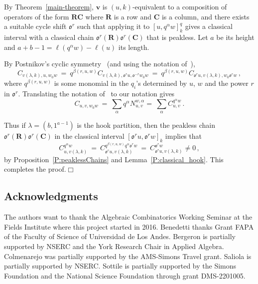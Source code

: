 \documentclass[12pt,oneside,reqno]{amsart}
\theoremstyle{definition}
\numberwithin{equation}{section}
\newcommand{\qv}{{\mathbf v}}
\newcommand{\ncycle}{\mathfrak o}
\def\R{\mathbf{R}}
\def\C{\mathbf{C}}
\begin{document}
By Theorem~\ref{main-theorem}, $\qv$ is $(u,k)$-equivalent to a composition of operators of the form
$\R\C$ where $\R$ is a row and $\C$ is a column, and there exists a
suitable cycle shift $\ncycle^r$ such that applying it to  $[u,q^\alpha w]^q_k$ gives a classical interval with
a classical chain $\ncycle^r(\R)\ncycle^r(\C)$ that is peakless.
Let $a$ be its height and $a+b-1=\ell(q^\alpha w)-\ell(u)$ its length.
 
By Postnikov's cyclic symmetry~\cite[Thm.~4]{Postnikov_symmetry} (and using the notation of~\cite{Postnikov_symmetry}),
\[
   C_{v(\lambda,k),u,w_0w}\ =\ q^{\beta(r,u,w)}C_{v(\lambda,k),\ncycle^{r} u,\ncycle^{-r}w_0w}\ =\ 
   q^{\beta(r,u,w)}C_{\ncycle^{r} u,v(\lambda,k),w_0\ncycle^{r}w}\,,
\]
where $q^{\beta(r,u,w)}$ is some monomial in the $q_i$'s determined by $u$, $w$ and the power $r$ in $\ncycle^r$.
Translating the notation of~\cite{Postnikov_symmetry} to our notation gives
\[
C_{u,v,w_0w}\ =\ \sum_\alpha q^\alpha N_{u,v}^{w,\alpha}=\ \sum_\alpha C_{u,v}^{q^\alpha w} \,.
\]

Thus if $\lambda=(b,1^{a-1})$ is the hook partition, then the peakless chain $\ncycle^r(\R)\ncycle^r(\C)$ in the classical interval 
$[\ncycle^{r} u,\ncycle^{r}w]_k$ implies that
\[
   C_{u,v(\lambda,k)}^{q^\alpha w}\ =\ C_{\ncycle^{r} u,v(\lambda,k)}^{ q^{\beta(r,u,w)}q^\alpha \ncycle^{r}w}\ =\
   C_{\ncycle^{r} u,v(\lambda,k)}^{ \ncycle^{r}w} \ne 0\,,
\]
by Proposition~\ref{P:peaklessChains} and Lemma~\ref{P:classical_hook}.
This completes the proof.\hfill$\Box$



\subsection*{Acknowledgments}
The authors want to thank the Algebraic Combinatorics Working Seminar at the Fields Institute where this project started in
2016.
Benedetti thanks Grant FAPA of the Faculty of Science of Universidad de Los Andes.
Bergeron is partially supported by NSERC and the York Research Chair in Applied Algebra.
Colmenarejo was partially supported by the AMS-Simons Travel grant.
Saliola is partially supported by NSERC.
Sottile is partially supported by the Simons Foundation and the National Science Foundation through grant DMS-2201005.





\end{document}
